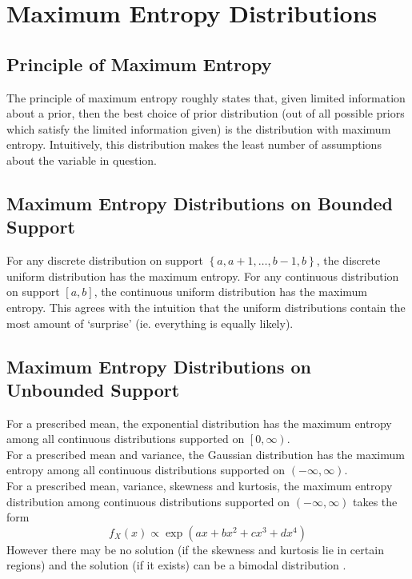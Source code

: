 \documentclass[11pt]{report} %
\begin{document}
\section{Maximum Entropy Distributions}

\subsection{Principle of Maximum Entropy}

The principle of maximum entropy roughly states that, given limited information about a prior, then the best choice of prior distribution (out of all possible priors which satisfy the limited information given) is the distribution with maximum entropy. Intuitively, this distribution makes the least number of assumptions about the variable in question.

\subsection{Maximum Entropy Distributions on Bounded Support}
For any discrete distribution on support $\left\{a, a + 1, \dots, b - 1, b\right\}$, the discrete uniform distribution has the maximum entropy. For any continuous distribution on support $\left[a, b\right]$, the continuous uniform distribution has the maximum entropy. This agrees with the intuition that the uniform distributions contain the most amount of `surprise' (ie. everything is equally likely).

\subsection{Maximum Entropy Distributions on Unbounded Support}

For a prescribed mean, the exponential distribution has the maximum entropy among all continuous distributions supported on $\left[0, \infty\right)$. \\

For a prescribed mean and variance, the Gaussian distribution has the maximum entropy among all continuous distributions supported on $\left(-\infty, \infty\right)$. \\

For a prescribed mean, variance, skewness and kurtosis, the maximum entropy distribution among continuous distributions supported on $\left(-\infty, \infty\right)$ takes the form
\begin{equation}
f_{X}\left(x\right) \propto \exp\left(ax + bx^{2} + cx^{3} + dx^{4}\right)
\end{equation}
However there may be no solution (if the skewness and kurtosis lie in certain regions) and the solution (if it exists) can be a bimodal distribution \cite{Rockinger2002}.
\end{document}
